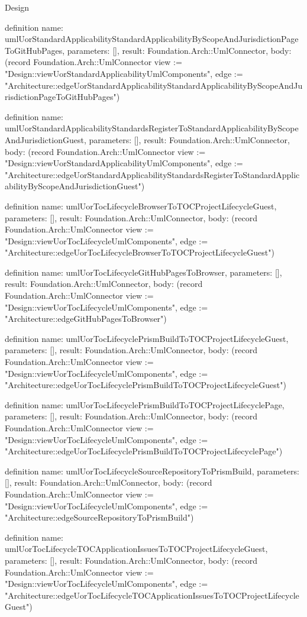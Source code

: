 \begin{lexlean}{Design}
\begin{semanticmodule}
definition{
  name: umlUorStandardApplicabilityStandardApplicabilityByScopeAndJurisdictionPageToGitHubPages,
  parameters: [],
  result: Foundation.Arch::UmlConnector,
  body: (record Foundation.Arch::UmlConnector {view := "Design::viewUorStandardApplicabilityUmlComponents", edge := "Architecture::edgeUorStandardApplicabilityStandardApplicabilityByScopeAndJurisdictionPageToGitHubPages"})
}

definition{
  name: umlUorStandardApplicabilityStandardsRegisterToStandardApplicabilityByScopeAndJurisdictionGuest,
  parameters: [],
  result: Foundation.Arch::UmlConnector,
  body: (record Foundation.Arch::UmlConnector {view := "Design::viewUorStandardApplicabilityUmlComponents", edge := "Architecture::edgeUorStandardApplicabilityStandardsRegisterToStandardApplicabilityByScopeAndJurisdictionGuest"})
}

definition{
  name: umlUorTocLifecycleBrowserToTOCProjectLifecycleGuest,
  parameters: [],
  result: Foundation.Arch::UmlConnector,
  body: (record Foundation.Arch::UmlConnector {view := "Design::viewUorTocLifecycleUmlComponents", edge := "Architecture::edgeUorTocLifecycleBrowserToTOCProjectLifecycleGuest"})
}

definition{
  name: umlUorTocLifecycleGitHubPagesToBrowser,
  parameters: [],
  result: Foundation.Arch::UmlConnector,
  body: (record Foundation.Arch::UmlConnector {view := "Design::viewUorTocLifecycleUmlComponents", edge := "Architecture::edgeGitHubPagesToBrowser"})
}

definition{
  name: umlUorTocLifecyclePrismBuildToTOCProjectLifecycleGuest,
  parameters: [],
  result: Foundation.Arch::UmlConnector,
  body: (record Foundation.Arch::UmlConnector {view := "Design::viewUorTocLifecycleUmlComponents", edge := "Architecture::edgeUorTocLifecyclePrismBuildToTOCProjectLifecycleGuest"})
}

definition{
  name: umlUorTocLifecyclePrismBuildToTOCProjectLifecyclePage,
  parameters: [],
  result: Foundation.Arch::UmlConnector,
  body: (record Foundation.Arch::UmlConnector {view := "Design::viewUorTocLifecycleUmlComponents", edge := "Architecture::edgeUorTocLifecyclePrismBuildToTOCProjectLifecyclePage"})
}

definition{
  name: umlUorTocLifecycleSourceRepositoryToPrismBuild,
  parameters: [],
  result: Foundation.Arch::UmlConnector,
  body: (record Foundation.Arch::UmlConnector {view := "Design::viewUorTocLifecycleUmlComponents", edge := "Architecture::edgeSourceRepositoryToPrismBuild"})
}

definition{
  name: umlUorTocLifecycleTOCApplicationIssuesToTOCProjectLifecycleGuest,
  parameters: [],
  result: Foundation.Arch::UmlConnector,
  body: (record Foundation.Arch::UmlConnector {view := "Design::viewUorTocLifecycleUmlComponents", edge := "Architecture::edgeUorTocLifecycleTOCApplicationIssuesToTOCProjectLifecycleGuest"})
}


\end{semanticmodule}
\end{lexlean}

